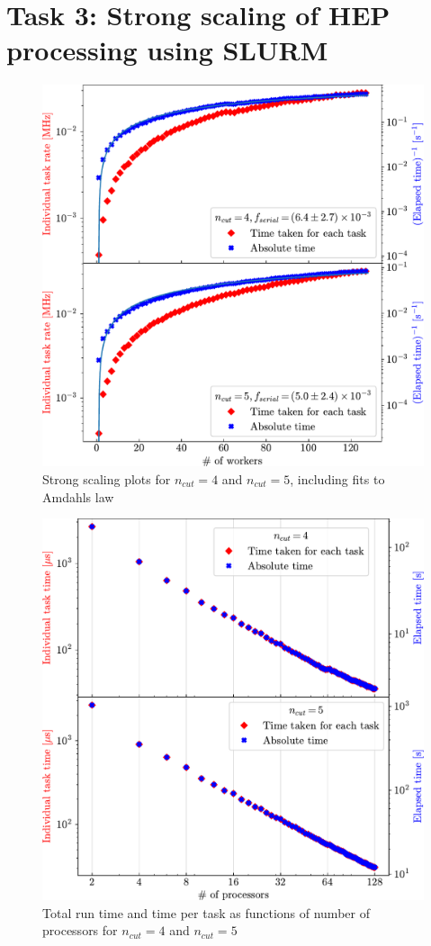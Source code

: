 \documentclass{article}
\begin{document}
\section{Task 3: Strong scaling of HEP processing using SLURM}
\begin{figure}
    \centering
    \includegraphics{Assignment_3_Task_farming/Report/Amdahl.pdf}
    \caption{Strong scaling plots for $n_{cut}=4$ and $n_{cut}=5$, including fits to Amdahls law}
    \label{fig:Amdahl}
\end{figure}

\begin{figure}
    \centering
    \includegraphics{Assignment_3_Task_farming/Report/Time_scaling.pdf}
    \caption{Total run time and time per task as functions of number of processors for $n_{cut}=4$ and $n_{cut}=5$}
    \label{fig:Time}
\end{figure}
\end{document}

